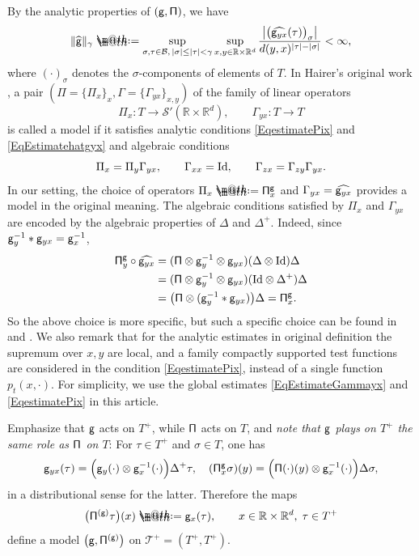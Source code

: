 \documentclass[10pt, reqno]{amsart}
\makeatletter
\numberwithin{subsection}{section}
\numberwithin{subsubsection}{subsection}
\numberwithin{equation}{section} %
\theoremstyle{mystyle}
\theoremstyle{mystyle2}
\theoremstyle{mystyle3}
\newcommand{\iden}{\text{\rm Id}}
\newcommand\bbR{\mathbb{R}}
\newcommand{\mcB}{\mathcal{B}}
\newcommand\mcS{\mathcal{S}}
\newcommand*{\defeq}{\mathrel{\rlap{%
                     \raisebox{0.3ex}{$\m@th\cdot$}}%
                     \raisebox{-0.3ex}{$\m@th\cdot$}}%
                     =}
\makeatother
\begin{document}
\noindent By the analytic properties of $\sf(g,\Pi)$, we have
\begin{align}\label{EqEstimatehatgyx}
\|\widehat{\sf g}\|_\gamma\defeq\sup_{\sigma,\tau\in\mcB,\,|\sigma|\le|\tau|<\gamma}\sup_{x,y\in\bbR\times\bbR^d}\frac{\big|\big(\widehat{{\sf g}_{yx}}(\tau)\big)_\sigma\big|}{d(y,x)^{|\tau|-|\sigma|}}<\infty,
\end{align}
where $(\cdot)_\sigma$ denotes the $\sigma$-components of elements of $T$.
In Hairer's original work \cite{Hai14}, a pair $(\Pi=\{\Pi_x\}_x,\Gamma=\{\Gamma_{yx}\}_{x,y})$ of the family of linear operators 
$$
\Pi_x:T\to\mcS'(\bbR\times\bbR^d),\qquad \Gamma_{yx}:T\to T
$$
is called a model if it satisfies analytic conditions \eqref{EqestimatePix} and \eqref{EqEstimatehatgyx} and algebraic conditions
$$
\Pi_x=\Pi_y\Gamma_{yx},\qquad
\Gamma_{xx}=\iden,\qquad
\Gamma_{zx}=\Gamma_{zy}\Gamma_{yx}.
$$
In our setting, the choice of operators $\Pi_x\defeq{\sf\Pi}_x^{\sf g}$ and $\Gamma_{yx}=\widehat{{\sf g}_{yx}}$ provides a model in the original meaning. The algebraic conditions satisfied by $\Pi_x$ and $\Gamma_{yx}$ are encoded by the algebraic properties of $\Delta$ and $\Delta^+$.
Indeed, since ${\sf g}_y^{-1}*{\sf g}_{yx}={\sf g}_x^{-1}$,
\begin{align}\label{EqTransitionRelation}
\begin{aligned}
{\sf\Pi}_y^{\sf g}\circ\widehat{{\sf g}_{yx}} 
&=({\sf\Pi}\otimes {\sf g}_y^{-1}\otimes {\sf g}_{yx})(\Delta\otimes\iden)\Delta\\
&=({\sf\Pi}\otimes {\sf g}_y^{-1}\otimes {\sf g}_{yx})(\iden\otimes\Delta^+)\Delta\\
&=\big({\sf\Pi}\otimes ({\sf g}_y^{-1}*{\sf g}_{yx})\big)\Delta={\sf\Pi}_x^{\sf g}.
\end{aligned}
\end{align}
So the above choice is more specific, but such a specific choice can be found in \cite[Section 8]{Hai14} and \cite{BHZ, ChandraHairer}.
We also remark that for the analytic estimates in original definition \cite{Hai14} the supremum over $x,y$ are local, and a family compactly supported test functions are considered in the condition \eqref{EqestimatePix}, instead of a single function $p_t(x,\cdot)$. For simplicity, we use the global estimates \eqref{EqEstimateGammayx} and \eqref{EqestimatePix} in this article. 

Emphasize that ${\sf g}$ acts on $T^+$, while $\sf \Pi$ acts on $T$, and \textit{note that ${\sf g}$ plays on $T^+$ the same role as ${\sf \Pi}$ on $T$}: For $\tau\in T^+$ and $\sigma\in T$, one has
\begin{equation}
\label{EqParallel}
{\sf g}_{yx}(\tau) = \Big({\sf g}_y(\cdot)\otimes {\sf g}_x^{-1}(\cdot)\Big)\Delta^+\tau, \quad
({\sf \Pi}_x^{\sf g}\sigma)(y) = \Big({\sf \Pi}(\cdot)(y)\otimes {\sf g}_x^{-1}(\cdot)\Big)\Delta\sigma,
\end{equation}
in a distributional sense for the latter. Therefore the maps
$$
\big({\sf \Pi}^{(\sf g)}\tau\big)(x) \defeq  {\sf g}_x(\tau), \qquad x\in\bbR\times\bbR^d,\;\tau\in T^+
$$
define a model $\sf \big(g,\Pi^{(g)}\big)$ on $\mathscr{T}^+=(T^+,T^+)$.
\end{document}

